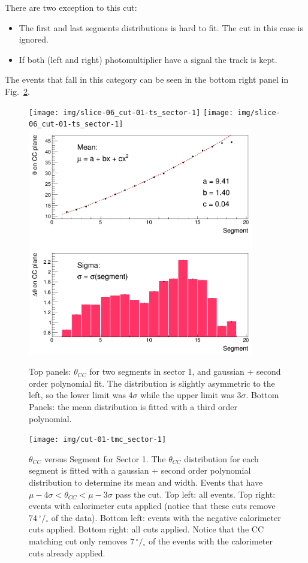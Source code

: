 There are two exception to this cut:
\begin{itemize}
    \item [1.] The first and last segments distributions is hard to fit.
    The cut in this case is ignored.
    \item [2.] If both (left and right) photomultiplier have a signal the track is kept.
\end{itemize}
The events that fall in this category can be seen in the bottom right panel in Fig.~\ref{fig:ccm_theta}.

\begin{figure}[ht]
    \vspace{-1cm}
    \centering
    \texttt{[image: img/slice-06\_cut-01-ts\_sector-1]}
    \texttt{[image: img/slice-06\_cut-01-ts\_sector-1]}
    \includegraphics[width=0.88\textwidth]{img/cut-01-tmp_sector-1}
    \caption{Top panels: $\theta_{CC}$ for two segments in sector 1, and gaussian + second order
    polynomial fit. The distribution is slightly asymmetric to the
    left, so the lower limit was $4\sigma$ while the upper limit
    was $3\sigma$.
    Bottom Panels: the mean distribution is fitted with a third order
    polynomial.  }
    \label{fig:ccm_slices}
\end{figure}


\begin{figure}[ht]
    \centering
    \texttt{[image: img/cut-01-tmc\_sector-1]}
    \caption{$\theta_{CC}$ versus Segment for Sector 1. The $\theta_{CC}$
        distribution for each segment is fitted with a gaussian +
        second order polynomial distribution to determine its mean
        and width. Events that have $\mu - 4\sigma < \theta_{CC} < \mu - 3\sigma$
        pass the cut.
        Top left: all events. Top right: events with calorimeter cuts applied
        (notice that these cuts remove $74 \,^{\circ\!\!}/\!_\circ$ of the data).
        Bottom left: events with the negative calorimeter cuts applied.
        Bottom right: all cuts applied. Notice that the CC matching cut
        only removes $7  \,^{\circ\!\!}/\!_\circ$ of the events with
        the calorimeter cuts already applied.}
    \label{fig:ccm_theta}
\end{figure}
